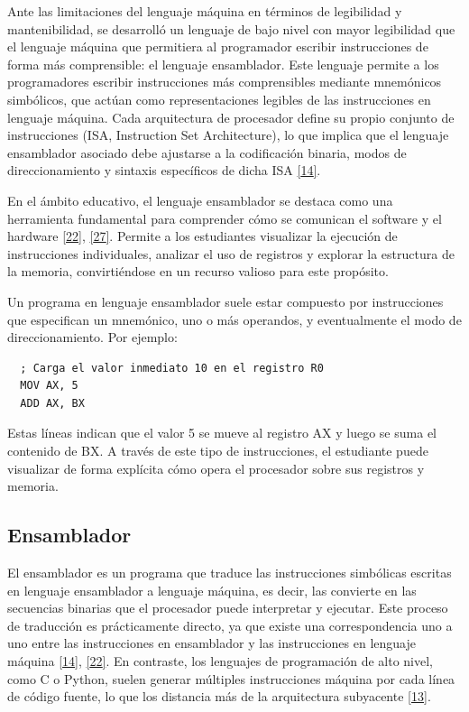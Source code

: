 \documentclass[12pt,oneside]{templates/unerthesis}
\begin{document}
Ante las limitaciones del lenguaje máquina en términos de legibilidad y mantenibilidad, se desarrolló un lenguaje de bajo nivel con mayor legibilidad que el lenguaje máquina que permitiera al programador escribir instrucciones de forma más comprensible: el lenguaje ensamblador. Este lenguaje permite a los programadores escribir instrucciones más comprensibles mediante mnemónicos simbólicos, que actúan como representaciones legibles de las instrucciones en lenguaje máquina. Cada arquitectura de procesador define su propio conjunto de instrucciones (ISA, Instruction Set Architecture), lo que implica que el lenguaje ensamblador asociado debe ajustarse a la codificación binaria, modos de direccionamiento y sintaxis específicos de dicha ISA \protect\hyperlink{ref-stallings_computer_2021}{{[}14{]}}.

En el ámbito educativo, el lenguaje ensamblador se destaca como una herramienta fundamental para comprender cómo se comunican el software y el hardware \protect\hyperlink{ref-tanenbaum_structured_2016}{{[}22{]}}, \protect\hyperlink{ref-null_essentials_2014}{{[}27{]}}. Permite a los estudiantes visualizar la ejecución de instrucciones individuales, analizar el uso de registros y explorar la estructura de la memoria, convirtiéndose en un recurso valioso para este propósito.

Un programa en lenguaje ensamblador suele estar compuesto por instrucciones que especifican un mnemónico, uno o más operandos, y eventualmente el modo de direccionamiento. Por ejemplo:

\begin{lstlisting}
  ; Carga el valor inmediato 10 en el registro R0
  MOV AX, 5
  ADD AX, BX
  \end{lstlisting}

Estas líneas indican que el valor 5 se mueve al registro AX y luego se suma el contenido de BX. A través de este tipo de instrucciones, el estudiante puede visualizar de forma explícita cómo opera el procesador sobre sus registros y memoria.

\hypertarget{ensamblador}{%
\subsection{Ensamblador}\label{ensamblador}}

El ensamblador es un programa que traduce las instrucciones simbólicas escritas en lenguaje ensamblador a lenguaje máquina, es decir, las convierte en las secuencias binarias que el procesador puede interpretar y ejecutar. Este proceso de traducción es prácticamente directo, ya que existe una correspondencia uno a uno entre las instrucciones en ensamblador y las instrucciones en lenguaje máquina \protect\hyperlink{ref-stallings_computer_2021}{{[}14{]}}, \protect\hyperlink{ref-tanenbaum_structured_2016}{{[}22{]}}. En contraste, los lenguajes de programación de alto nivel, como C o Python, suelen generar múltiples instrucciones máquina por cada línea de código fuente, lo que los distancia más de la arquitectura subyacente \protect\hyperlink{ref-hennessy2017computer}{{[}13{]}}.
\end{document}
